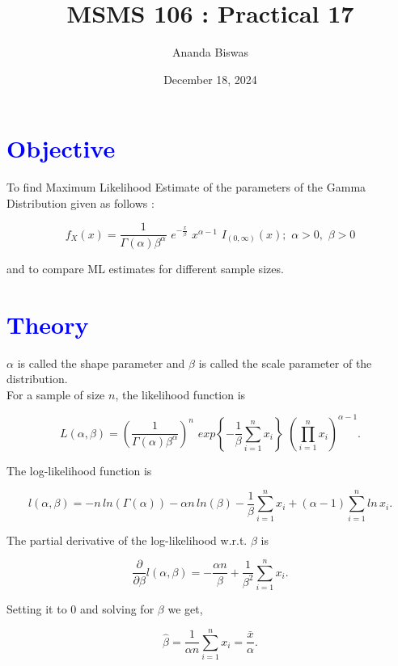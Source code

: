 \documentclass[11pt, a4paper]{article}\usepackage[]{graphicx}\usepackage[]{xcolor}
\title{MSMS 106 : Practical 17}
\author{Ananda Biswas}
\date{December 18, 2024}
\begin{document}
\maketitle


\section*{\faArrowAltCircleRight[regular] \textcolor{blue}{Objective}}

\hspace{1cm} To find Maximum Likelihood Estimate of the parameters of the Gamma Distribution given as follows :

$$f_X (x) = \dfrac{1}{\Gamma(\alpha) \beta^\alpha} \,\, e^{-\frac{x}{\beta}} \,\, x^{\alpha - 1} \,\, I_{(0, \infty)}(x); \,\, \alpha > 0, \,\, \beta > 0 $$

and to compare ML estimates for different sample sizes. 



\section*{\faArrowAltCircleRight[regular] \textcolor{blue}{Theory}}

$\alpha$ is called the shape parameter and $\beta$ is called the scale parameter of the distribution. \\

For a sample of size $n$, the likelihood function is 

$$L(\alpha, \beta) = \left( \dfrac{1}{\Gamma(\alpha) \beta^\alpha} \right)^{n} \,\, exp \left\{-\dfrac{1}{\beta}\sum \limits_{i = 1}^{n} x_i \right\} \,\, \left( \prod \limits_{i = 1}^{n} x_i \right)^{\alpha - 1}. $$


The log-likelihood function is 

$$ l(\alpha, \beta) = -n \, ln(\Gamma(\alpha)) - \alpha n \, ln(\beta) - \dfrac{1}{\beta}\sum \limits_{i = 1}^{n} x_i + ({\alpha - 1}) \sum \limits_{i = 1}^{n} ln \, x_i .$$

The partial derivative of the log-likelihood w.r.t. $\beta$ is

$$ \dfrac{\partial}{\partial \beta} l(\alpha, \beta) = - \dfrac{\alpha n}{\beta} + \dfrac{1}{\beta^2}\sum \limits_{i = 1}^{n} x_i . $$

Setting it to $0$ and solving for $\beta$ we get,

\begin{equation}
\hat{\beta} =  \dfrac{1}{\alpha n}\sum \limits_{i = 1}^{n} x_i = \dfrac{\bar{x}}{\alpha}.
\end{equation}
\end{document}
